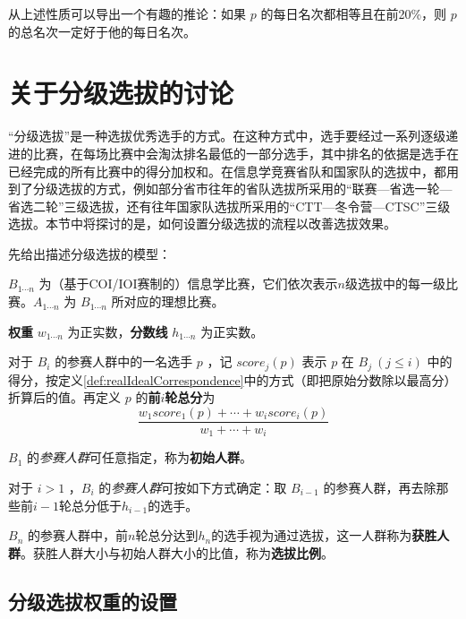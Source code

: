             从上述性质可以导出一个有趣的推论：如果 $p$ 的每日名次都相等且在前20\%，则 $p$ 的总名次一定好于他的每日名次。

\section{关于分级选拔的讨论}\label{sec:sec6Multilevel}

    “分级选拔”是一种选拔优秀选手的方式。在这种方式中，选手要经过一系列逐级递进的比赛，在每场比赛中会淘汰排名最低的一部分选手，其中排名的依据是选手在已经完成的所有比赛中的得分加权和。在信息学竞赛省队和国家队的选拔中，都用到了分级选拔的方式，例如部分省市往年的省队选拔所采用的“联赛---省选一轮---省选二轮”三级选拔，还有往年国家队选拔所采用的“CTT---冬令营---CTSC”三级选拔。本节中将探讨的是，如何设置分级选拔的流程以改善选拔效果。

    \vspace{1.5ex}

    先给出描述分级选拔的模型：
    \begin{asparaitem}
        \item $B_{1\cdots n}$ 为（基于COI/IOI赛制的）信息学比赛，它们依次表示$n$级选拔中的每一级比赛。$A_{1\cdots n}$ 为 $B_{1\cdots n}$ 所对应的理想比赛。
        \item \textbf{权重} $w_{1\cdots n}$ 为正实数，\textbf{分数线} $h_{1\cdots n}$ 为正实数。
        \item 对于 $B_i$ 的参赛人群中的一名选手 $p$ ，记 $\textit{score}_{j}(p)$ 表示 $p$ 在 $B_j\  (j\leq i)$ 中的得分，按定义\ref{def:realIdealCorrespondence}中的方式（即把原始分数除以最高分）折算后的值。再定义 $p$ 的\textbf{前$i$轮总分}为 $$\frac{w_1\textit{score}_1(p)+\cdots+w_i\textit{score}_i(p)}{w_1+\cdots+w_i}$$
        \item $B_1$ 的\emph{参赛人群}可任意指定，称为\textbf{初始人群}。
        \item 对于 $i>1$ ，$B_i$ 的\emph{参赛人群}可按如下方式确定：取 $B_{i-1}$ 的参赛人群，再去除那些前$i-1$轮总分低于$h_{i-1}$的选手。
        \item $B_n$ 的参赛人群中，前$n$轮总分达到$h_n$的选手视为通过选拔，这一人群称为\textbf{获胜人群}。获胜人群大小与初始人群大小的比值，称为\textbf{选拔比例}。
    \end{asparaitem}

    \subsection{分级选拔权重的设置}

